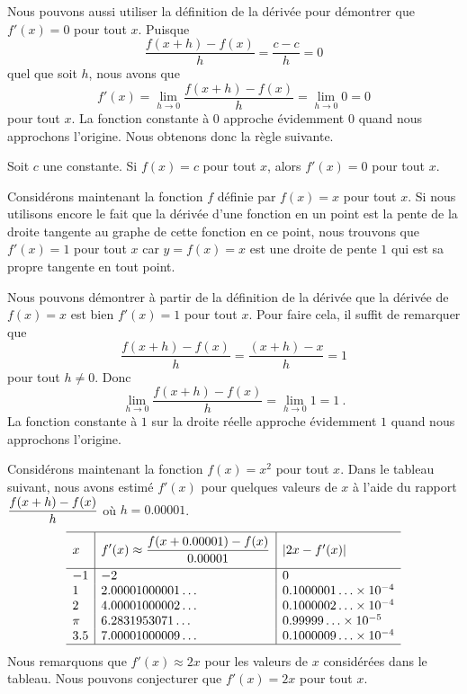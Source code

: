 {Nous pouvons aussi utiliser la définition de la dérivée pour démontrer que
$f'(x) = 0$ pour tout $x$.  Puisque
\[
\frac{f(x+h)-f(x)}{h} = \frac{c-c}{h} = 0
\]
quel que soit $h$, nous avons que
\[
f'(x) = \lim_{h\rightarrow 0} \frac{f(x+h)-f(x)}{h}
= \lim_{h\rightarrow 0} 0 = 0
\]
pour tout $x$.  La fonction constante à $0$ approche évidemment $0$
quand nous approchons l'origine.  Nous obtenons donc la règle suivante.

\begin{prop}
Soit $c$ une constante.  Si $f(x) = c$ pour tout $x$, alors
$f'(x) = 0$ pour tout $x$.
\end{prop}

Considérons maintenant la fonction $f$ définie par $f(x) = x$ pour
tout $x$.  Si nous utilisons
encore le fait que la dérivée d'une fonction en un point est la pente
de la droite tangente au graphe de cette fonction en ce point, nous
trouvons que $f'(x) = 1$ pour tout $x$ car $y = f(x)= x$ est une 
droite de pente $1$ qui est sa propre tangente en tout point.

Nous pouvons démontrer à partir de la définition de la dérivée que la
dérivée de $f(x) = x$ est bien $f'(x) = 1$ pour tout $x$.  Pour faire 
cela, il suffit de remarquer que
\[
\frac{f(x+h)-f(x)}{h} = \frac{(x+h)-x}{h} = 1
\]
pour tout $h \neq 0$.  Donc
\[
\lim_{h\rightarrow 0} \frac{f(x+h)-f(x)}{h} = \lim_{h\rightarrow 0} 1
= 1 \ .
\]
La fonction constante à $1$ sur la droite réelle approche
évidemment $1$ quand nous approchons l'origine.

Considérons maintenant la fonction $f(x)=x^2$ pour tout $x$.  Dans le
tableau suivant, nous avons estimé $f'(x)$ pour quelques valeurs de $x$ à
l'aide du rapport $\displaystyle \frac{f(x+h)-f(x)}{h}$ où
$h = 0.00001$.
\[
\begin{array}{l|l|l}
\hline
x & \rule{0em}{1.7em}
\DS f'(x) \approx \frac{f(x+0.00001)-f(x)}{0.00001}
& |2x - f'(x)| \\[0.8em]
\hline
-1 & -2 & 0 \\
1 & 2.00001000001\ldots & 0.1000001\ldots \times 10^{-4} \\
2 & 4.00001000002\ldots & 0.1000002\ldots \times 10^{-4} \\
\pi & 6.2831953071\ldots & 0.99999\ldots \times 10^{-5} \\
3.5 & 7.00001000009\ldots & 0.1000009\ldots \times 10^{-4} \\
\hline
\end{array}
\]
Nous remarquons que $f'(x) \approx 2x$ pour les valeurs de $x$ considérées
dans le tableau.  Nous pouvons conjecturer que $f'(x) = 2x$ pour tout $x$.

}
